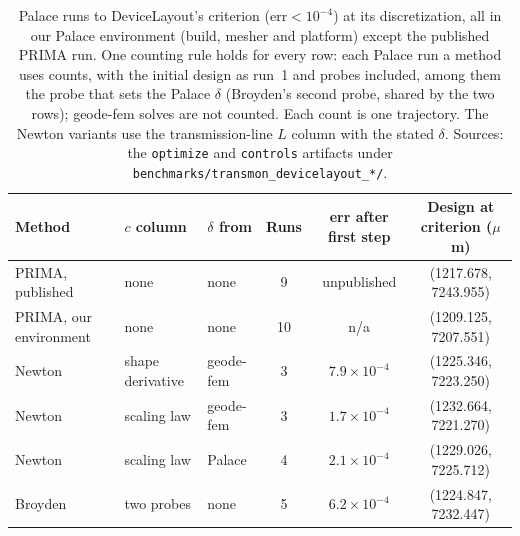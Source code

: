 \documentclass{anvil-paper}
\begin{document}
\begin{table}[htbp]
  \centering
  \caption{Palace runs to DeviceLayout's criterion ($\mathrm{err} <
  10^{-4}$) at its discretization, all in our Palace environment (build,
  mesher and platform) except the published PRIMA run. One counting rule
  holds for every row: each Palace run a method uses counts, with the
  initial design as run~1 and probes included, among them the probe that
  sets the Palace $\delta$ (Broyden's second probe, shared by the two rows);
  geode-fem solves are not counted. Each count is one trajectory. The
  Newton variants use the transmission-line $L$ column with the stated
  $\delta$.
  Sources: the \texttt{optimize} and \texttt{controls} artifacts under
  \texttt{benchmarks/transmon\_devicelayout\_*/}.}
  \label{tab:controls}
  \footnotesize
  \begin{tabular}{@{}lllccc@{}}
    \toprule
    Method & $c$ column & $\delta$ from & Runs & err after first step & Design at criterion ($\mu$m) \\
    \midrule
    PRIMA, published & none & none & 9 & unpublished & (1217.678, 7243.955) \\
    PRIMA, our environment & none & none & 10 & n/a & (1209.125, 7207.551) \\
    Newton & shape derivative & geode-fem & 3 & $7.9\times10^{-4}$ & (1225.346, 7223.250) \\
    Newton & scaling law & geode-fem & 3 & $1.7\times10^{-4}$ & (1232.664, 7221.270) \\
    Newton & scaling law & Palace & 4 & $2.1\times10^{-4}$ & (1229.026, 7225.712) \\
    Broyden & two probes & none & 5 & $6.2\times10^{-4}$ & (1224.847, 7232.447) \\
    \bottomrule
  \end{tabular}
\end{table}
\end{document}
